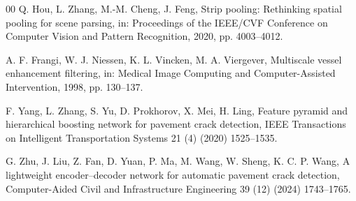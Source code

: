 \documentclass[preprint,12pt]{elsarticle}
\begin{document}
\begin{thebibliography}{00}
Q. Hou, L. Zhang, M.-M. Cheng, J. Feng,
Strip pooling: Rethinking spatial pooling for scene parsing,
in: Proceedings of the IEEE/CVF Conference on Computer Vision and Pattern Recognition, 2020, pp. 4003--4012.

A. F. Frangi, W. J. Niessen, K. L. Vincken, M. A. Viergever,
Multiscale vessel enhancement filtering,
in: Medical Image Computing and Computer-Assisted Intervention, 1998, pp. 130--137.

F. Yang, L. Zhang, S. Yu, D. Prokhorov, X. Mei, H. Ling,
Feature pyramid and hierarchical boosting network for pavement crack detection,
IEEE Transactions on Intelligent Transportation Systems 21 (4) (2020) 1525--1535.

G. Zhu, J. Liu, Z. Fan, D. Yuan, P. Ma, M. Wang, W. Sheng, K. C. P. Wang,
A lightweight encoder--decoder network for automatic pavement crack detection,
Computer-Aided Civil and Infrastructure Engineering 39 (12) (2024) 1743--1765.

\end{thebibliography}
\end{document}
